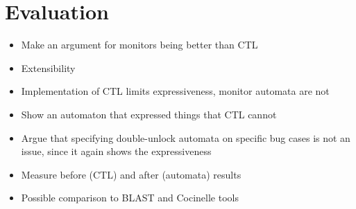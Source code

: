 \section{Evaluation}

\begin{itemize}
    \item Make an argument for monitors being better than CTL 
    \item Extensibility
    \setlength\itemindent{15pt} 
    \item Implementation of CTL limits expressiveness, monitor automata are not
    \item Show an automaton that expressed things that CTL cannot
    \item Argue that specifying double-unlock automata on specific bug cases is not an issue, since it again shows the expressiveness 
    \setlength\itemindent{0pt}
    
    \item Measure before (CTL) and after (automata) results
    \item Possible comparison to BLAST and Cocinelle tools
\end{itemize}